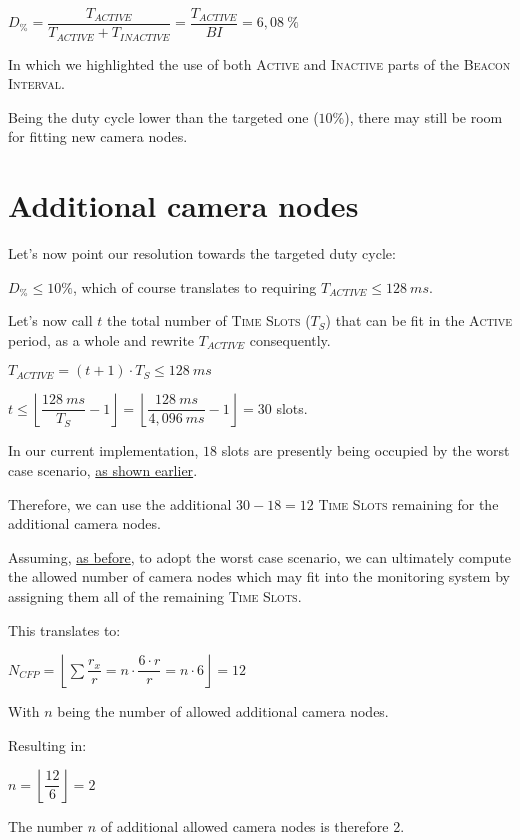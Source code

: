 \documentclass[a4paper,11pt]{article} %
\newcommand{\floor}[1]{\left\lfloor #1 \right\rfloor}
\begin{document}
\medskip

$D_{\%} = \dfrac{T_{ACTIVE}}{T_{ACTIVE} + T_{INACTIVE}} = \dfrac{T_{ACTIVE}}{BI} = 6,08\ \%$

\medskip

In which we highlighted the use of both \textsc{Active} and \textsc{Inactive} parts of the \textsc{Beacon Interval}.

\bigskip

Being the duty cycle lower than the targeted one ($10\%$), there may still be room for fitting new camera nodes.

\section{Additional camera nodes}

Let's now point our resolution towards the targeted duty cycle:

\smallskip

$D_{\%} \leq 10 \%$, which of course translates to requiring $T_{ACTIVE} \leq 128\ ms$.

\medskip

Let's now call $t$ the total number of \textsc{Time Slots} ($T_S$) that can be fit in the \textsc{Active} period, as a whole and rewrite $T_{ACTIVE}$ consequently.

\smallskip

$T_{ACTIVE} = (t + 1) \cdot T_S \leq 128\ ms$

\medskip

$t \leq \floor{\dfrac{128\ ms}{T_S} - 1} = \floor{\dfrac{128\ ms}{4,096\ ms} - 1} = 30$ slots.

\medskip

In our current implementation, $18$ slots are presently being occupied by the worst case scenario, \hyperref[worst-case]{as shown earlier}.

\smallskip

Therefore, we can use the additional $30 - 18 = 12$ \textsc{Time Slots} remaining for the additional camera nodes.

\medskip

Assuming, \hyperref[worst-case]{as before}, to adopt the worst case scenario, we can ultimately compute the allowed number of camera nodes which may fit into the monitoring system by assigning them all of the remaining \textsc{Time Slots}.

\smallskip

This translates to:

\medskip

$N_{CFP} = \floor{\displaystyle\sum \dfrac{r_x}{r} = n \cdot \dfrac{6 \cdot r}{r} = n \cdot 6} = 12$

\medskip

With $n$ being the number of allowed additional camera nodes.

\medskip

Resulting in:

\smallskip

$n = \floor{\dfrac{12}{6}} = 2$

\bigskip

The number $n$ of additional allowed camera nodes is therefore 2.
\end{document}
